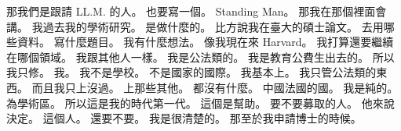\hypertarget{c01:cue:2876}{}那我們是跟請 LL.M. 的人。
\hypertarget{c01:cue:2877}{}也要寫一個。
\hypertarget{c01:cue:2878}{}Standing Man。
\hypertarget{c01:cue:2879}{}那我在那個裡面會講。
\hypertarget{c01:cue:2880}{}我過去我的學術研究。
\hypertarget{c01:cue:2881}{}是做什麼的。
\hypertarget{c01:cue:2882}{}比方說我在臺大的碩士論文。
\hypertarget{c01:cue:2883}{}去用哪些資料。
\hypertarget{c01:cue:2884}{}寫什麼題目。
\hypertarget{c01:cue:2885}{}我有什麼想法。
\hypertarget{c01:cue:2886}{}像我現在來 Harvard。
\hypertarget{c01:cue:2887}{}我打算還要繼續在哪個領域。
\hypertarget{c01:cue:2888}{}我跟其他人一樣。
\hypertarget{c01:cue:2889}{}我是公法類的。
\hypertarget{c01:cue:2890}{}我是教育公費生出去的。
\hypertarget{c01:cue:2891}{}所以我只修。
\hypertarget{c01:cue:2892}{}我。
\hypertarget{c01:cue:2893}{}我不是學校。
\hypertarget{c01:cue:2894}{}不是國家的國際。
\hypertarget{c01:cue:2895}{}我基本上。
\hypertarget{c01:cue:2896}{}我只管公法類的東西。
\hypertarget{c01:cue:2897}{}而且我只上沒過。
\hypertarget{c01:cue:2898}{}上那些其他。
\hypertarget{c01:cue:2899}{}都沒有什麼。
\hypertarget{c01:cue:2900}{}中國法國的國。
\hypertarget{c01:cue:2901}{}我是純的。
\hypertarget{c01:cue:2902}{}為學術區。
\hypertarget{c01:cue:2903}{}所以這是我的時代第一代。
\hypertarget{c01:cue:2904}{}這個是幫助。
\hypertarget{c01:cue:2905}{}要不要募取的人。
\hypertarget{c01:cue:2906}{}他來說決定。
\hypertarget{c01:cue:2907}{}這個人。
\hypertarget{c01:cue:2908}{}還要不要。
\hypertarget{c01:cue:2909}{}我是很清楚的。
\hypertarget{c01:cue:2910}{}那至於我申請博士的時候。

